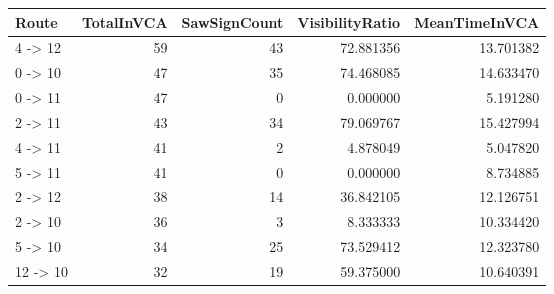 \begin{tabular}{lrrrr}
\toprule
Route & TotalInVCA & SawSignCount & VisibilityRatio & MeanTimeInVCA \\
\midrule
4 -> 12 & 59 & 43 & 72.881356 & 13.701382 \\
0 -> 10 & 47 & 35 & 74.468085 & 14.633470 \\
0 -> 11 & 47 & 0 & 0.000000 & 5.191280 \\
2 -> 11 & 43 & 34 & 79.069767 & 15.427994 \\
4 -> 11 & 41 & 2 & 4.878049 & 5.047820 \\
5 -> 11 & 41 & 0 & 0.000000 & 8.734885 \\
2 -> 12 & 38 & 14 & 36.842105 & 12.126751 \\
2 -> 10 & 36 & 3 & 8.333333 & 10.334420 \\
5 -> 10 & 34 & 25 & 73.529412 & 12.323780 \\
12 -> 10 & 32 & 19 & 59.375000 & 10.640391 \\
\bottomrule
\end{tabular}
